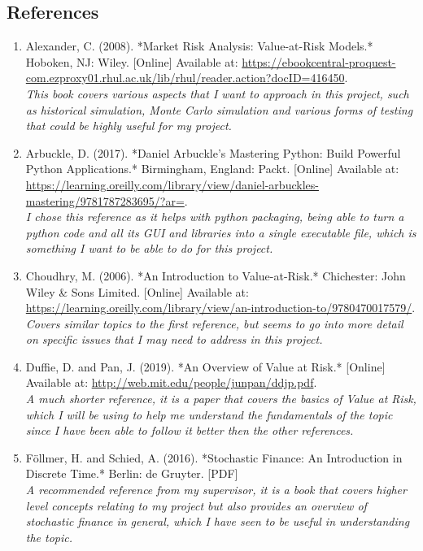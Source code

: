 \documentclass{article}
\begin{document}
\subsection{References}
\begin{small}
\begin{enumerate}
  \item\label{ref1} Alexander, C. (2008). *Market Risk Analysis: Value-at-Risk Models.* Hoboken, NJ: Wiley. [Online] Available at: \url{https://ebookcentral-proquest-com.ezproxy01.rhul.ac.uk/lib/rhul/reader.action?docID=416450}.
  \\\textit{This book covers various aspects that I want to approach in this project, such as historical simulation, Monte Carlo simulation and various forms of testing that could be highly useful for my project.}
  
  \item\label{ref2} Arbuckle, D. (2017). *Daniel Arbuckle's Mastering Python: Build Powerful Python Applications.* Birmingham, England: Packt. [Online] Available at: \url{https://learning.oreilly.com/library/view/daniel-arbuckles-mastering/9781787283695/?ar=}.
  \\\textit{I chose this reference as it helps with python packaging, being able to turn a python code and all its GUI and libraries into a single executable file, which is something I want to be able to do for this project.}

  \item\label{ref3} Choudhry, M. (2006). *An Introduction to Value-at-Risk.* Chichester: John Wiley \& Sons Limited. [Online] Available at: \\ \url{https://learning.oreilly.com/library/view/an-introduction-to/9780470017579/}.
  \\\textit{Covers similar topics to the first reference, but seems to go into more detail on specific issues that I may need to address in this project.}
  
  \item\label{ref4} Duffie, D. and Pan, J. (2019). *An Overview of Value at Risk.* [Online] Available at: \url{http://web.mit.edu/people/junpan/ddjp.pdf}.
  \\\textit{A much shorter reference, it is a paper that covers the basics of Value at Risk, which I will be using to help me understand the fundamentals of the topic since I have been able to follow it better then the other references.}
  
  \item\label{ref5} Föllmer, H. and Schied, A. (2016). *Stochastic Finance: An Introduction in Discrete Time.* Berlin: de Gruyter. [PDF]
  \\\textit{A recommended reference from my supervisor, it is a book that covers higher level concepts relating to my project but also provides an overview of stochastic finance in general, which I have seen to be useful in understanding the topic.}
  

\end{enumerate}
\end{small}
\end{document}
